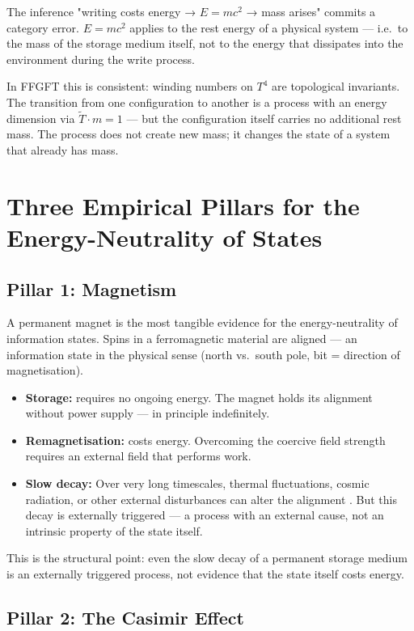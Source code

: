 The inference "writing costs energy → $E=mc^2$ → mass arises" commits a
category error. $E=mc^2$ applies to the rest energy of a physical system —
i.e.\ to the mass of the storage medium itself, not to the energy that
dissipates into the environment during the write process.

In FFGFT this is consistent: winding numbers on $T^4$ are topological
invariants. The transition from one configuration to another is a process
with an energy dimension via $\tilde{T}\cdot m=1$ — but the configuration
itself carries no additional rest mass. The process does not create new
mass; it changes the state of a system that already has mass.

\section{Three Empirical Pillars for the Energy-Neutrality of States}

\subsection{Pillar 1: Magnetism}

A permanent magnet is the most tangible evidence for the energy-neutrality
of information states. Spins in a ferromagnetic material are aligned —
an information state in the physical sense (north vs.\ south pole, bit =
direction of magnetisation).

\begin{itemize}
  \item \textbf{Storage:} requires no ongoing energy. The magnet holds
        its alignment without power supply — in principle indefinitely.
  \item \textbf{Remagnetisation:} costs energy. Overcoming the coercive
        field strength requires an external field that performs work.
  \item \textbf{Slow decay:} Over very long timescales, thermal
        fluctuations, cosmic radiation, or other external disturbances
        can alter the alignment \cite{Nattermann1990}. But this decay
        is externally triggered — a process with an external cause,
        not an intrinsic property of the state itself.
\end{itemize}

This is the structural point: even the slow decay of a permanent storage
medium is an externally triggered process, not evidence that the state
itself costs energy.

\subsection{Pillar 2: The Casimir Effect}

